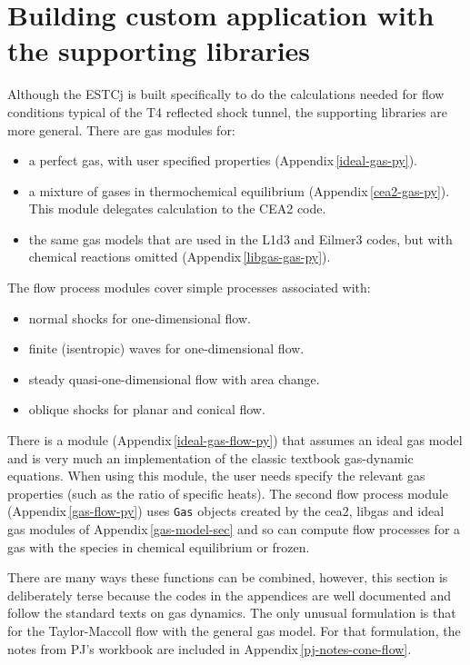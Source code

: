 \documentclass[landscape,12pt,a4paper]{article}
\begin{document}
\section{Building custom application with the supporting libraries}
\label{the-libraries}
%
Although the ESTCj is built specifically to do the calculations 
needed for flow conditions typical of the T4 reflected shock tunnel,
the supporting libraries are more general.
There are gas modules for:
\begin{itemize}
 \item a perfect gas, with user specified properties (Appendix\,\ref{ideal-gas-py}).
 \item a mixture of gases in thermochemical equilibrium (Appendix\,\ref{cea2-gas-py}).
   This module delegates calculation to the CEA2 code.
 \item the same gas models that are used in the L1d3 and Eilmer3 codes,
   but with chemical reactions omitted (Appendix\,\ref{libgas-gas-py}).
\end{itemize}
%
The flow process modules cover simple processes associated with:
\begin{itemize}
 \item normal shocks for one-dimensional flow.
 \item finite (isentropic) waves for one-dimensional flow.
 \item steady quasi-one-dimensional flow with area change.
 \item oblique shocks for planar and conical flow.
\end{itemize}
There is a module (Appendix\,\ref{ideal-gas-flow-py})
that assumes an ideal gas model and is very much an implementation of the classic
textbook gas-dynamic equations.
When using this module, the user needs specify the
relevant gas properties (such as the ratio of specific heats).
The second flow process module (Appendix\,\ref{gas-flow-py}) uses \verb!Gas! objects
created by the cea2, libgas and ideal gas modules of Appendix\,\ref{gas-model-sec} 
and so can compute flow processes for a gas with the species in chemical equilibrium or frozen.

\medskip
There are many ways these functions can be combined, however,
this section is deliberately terse because the codes in the appendices are well documented
and follow the standard texts on gas dynamics.
The only unusual formulation is that for the Taylor-Maccoll flow with the general gas model.
For that formulation, the notes from PJ's workbook are included 
in Appendix\,\ref{pj-notes-cone-flow}.
\end{document}
